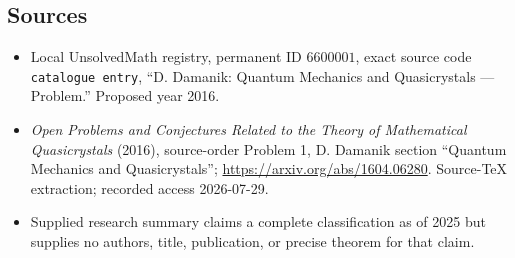 \documentclass[11pt]{article}
\begin{document}
\subsection{Sources}
\begin{itemize}
\item Local UnsolvedMath registry, permanent ID \(6600001\), exact source code \texttt{catalogue entry}, ``D. Damanik: Quantum Mechanics and Quasicrystals --- Problem.'' Proposed year 2016.
\item \emph{Open Problems and Conjectures Related to the Theory of Mathematical Quasicrystals} (2016), source-order Problem 1, D. Damanik section ``Quantum Mechanics and Quasicrystals''; \url{https://arxiv.org/abs/1604.06280}. Source-TeX extraction; recorded access 2026-07-29.
\item Supplied research summary claims a complete classification as of 2025 but supplies no authors, title, publication, or precise theorem for that claim.
\end{itemize}
\end{document}
